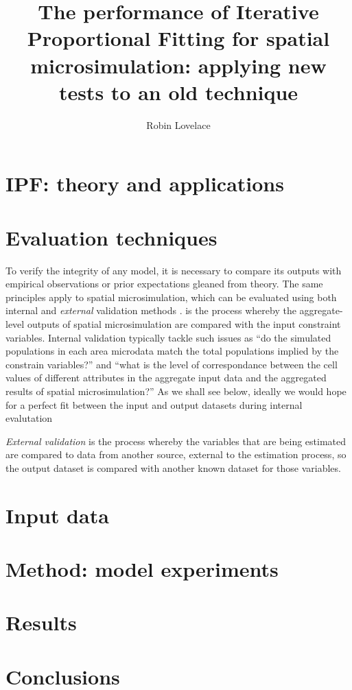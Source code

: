 \documentclass[a4paper,10pt]{article}
\title{The performance of Iterative Proportional Fitting for spatial microsimulation: applying new tests to an old technique}
\author{Robin Lovelace}
\begin{document}
\maketitle

\section{IPF: theory and applications}
\section{Evaluation techniques}

To verify the integrity of any model, it is necessary to compare its outputs 
with empirical observations or prior expectations gleaned from theory. 
The same principles apply to spatial microsimulation, which can be evaluated using
both internal and \emph{external} validation methods \citep{Edwards2009}. 
 is the process whereby
the aggregate-level outputs of spatial microsimulation are compared with
the input constraint variables. Internal validation typically tackle such issues 
as ``do the simulated populations in each area 
microdata match the total populations implied by the constrain variables?''
and ``what is the level of correspondance between the cell values of different 
attributes in the aggregate input data and the aggregated results of spatial microsimulation?''
As we shall see below, ideally we would hope for a perfect fit between the input
and output datasets during internal evalutation
 
\emph{External validation} is the process whereby the variables that are 
being estimated are compared to data from another source, 
external to the estimation process, so the output dataset is compared with 
another known dataset for those variables.

\section{Input data}
\section{Method: model experiments}
\section{Results}
\section{Conclusions}


\end{document}
